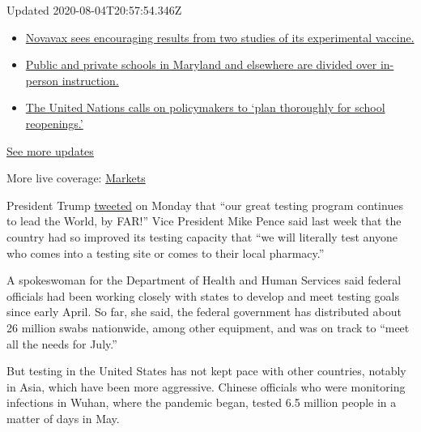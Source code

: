 Updated 2020-08-04T20:57:54.346Z

\begin{itemize}
\tightlist
\item
  \href{https://www.nytimes.com/2020/08/04/world/coronavirus-cases.html?action=click\&pgtype=Article\&state=default\&region=MAIN_CONTENT_1\&context=storylines_live_updates\#link-1228a480}{Novavax
  sees encouraging results from two studies of its experimental
  vaccine.}
\item
  \href{https://www.nytimes.com/2020/08/04/world/coronavirus-cases.html?action=click\&pgtype=Article\&state=default\&region=MAIN_CONTENT_1\&context=storylines_live_updates\#link-4825b93}{Public
  and private schools in Maryland and elsewhere are divided over
  in-person instruction.}
\item
  \href{https://www.nytimes.com/2020/08/04/world/coronavirus-cases.html?action=click\&pgtype=Article\&state=default\&region=MAIN_CONTENT_1\&context=storylines_live_updates\#link-50f7386d}{The
  United Nations calls on policymakers to `plan thoroughly for school
  reopenings.'}
\end{itemize}

\href{https://www.nytimes.com/2020/08/04/world/coronavirus-cases.html?action=click\&pgtype=Article\&state=default\&region=MAIN_CONTENT_1\&context=storylines_live_updates}{See
more updates}

More live coverage:
\href{https://www.nytimes.com/live/2020/08/04/business/stock-market-today-coronavirus?action=click\&pgtype=Article\&state=default\&region=MAIN_CONTENT_1\&context=storylines_live_updates}{Markets}

President Trump
\href{https://twitter.com/realDonaldTrump/status/1280205902742781958?s=20}{tweeted}
on Monday that ``our great testing program continues to lead the World,
by FAR!'' Vice President Mike Pence said last week that the country had
so improved its testing capacity that ``we will literally test anyone
who comes into a testing site or comes to their local pharmacy.''

A spokeswoman for the Department of Health and Human Services said
federal officials had been working closely with states to develop and
meet testing goals since early April. So far, she said, the federal
government has distributed about 26 million swabs nationwide, among
other equipment, and was on track to ``meet all the needs for July.''

But testing in the United States has not kept pace with other countries,
notably in Asia, which have been more aggressive. Chinese officials who
were monitoring infections in Wuhan, where the pandemic began, tested
6.5 million people in a matter of days in May.

